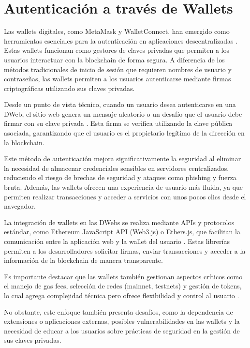 \section{Autenticación a través de Wallets}

Las wallets digitales, como MetaMask y WalletConnect, han emergido como herramientas esenciales para la autenticación en aplicaciones descentralizadas \cite{metamask, walletconnect}. Estas wallets funcionan como gestores de claves privadas que permiten a los usuarios interactuar con la blockchain de forma segura. A diferencia de los métodos tradicionales de inicio de sesión que requieren nombres de usuario y contraseñas, las wallets permiten a los usuarios autenticarse mediante firmas criptográficas utilizando sus claves privadas.

Desde un punto de vista técnico, cuando un usuario desea autenticarse en una DWeb, el sitio web genera un mensaje aleatorio o un desafío que el usuario debe firmar con su clave privada \cite{hamilton2015ethereum}. Esta firma se verifica utilizando la clave pública asociada, garantizando que el usuario es el propietario legítimo de la dirección en la blockchain.

Este método de autenticación mejora significativamente la seguridad al eliminar la necesidad de almacenar credenciales sensibles en servidores centralizados, reduciendo el riesgo de brechas de seguridad y ataques como phishing y fuerza bruta. Además, las wallets ofrecen una experiencia de usuario más fluida, ya que permiten realizar transacciones y acceder a servicios con unos pocos clics desde el navegador.

La integración de wallets en las DWebs se realiza mediante APIs y protocolos estándar, como Ethereum JavaScript API (Web3.js) o Ethers.js, que facilitan la comunicación entre la aplicación web y la wallet del usuario \cite{web3js, ethersjs}. Estas librerías permiten a los desarrolladores solicitar firmas, enviar transacciones y acceder a la información de la blockchain de manera transparente.

Es importante destacar que las wallets también gestionan aspectos críticos como el manejo de gas fees, selección de redes (mainnet, testnets) y gestión de tokens, lo cual agrega complejidad técnica pero ofrece flexibilidad y control al usuario \cite{antonopoulos2018mastering}.

No obstante, este enfoque también presenta desafíos, como la dependencia de extensiones o aplicaciones externas, posibles vulnerabilidades en las wallets y la necesidad de educar a los usuarios sobre prácticas de seguridad en la gestión de sus claves privadas.

